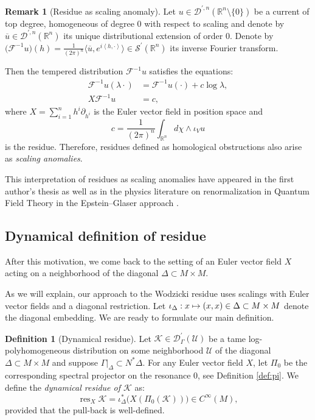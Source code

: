 \documentclass[JEP,XML,SOM,Unicode]{cedram}
\let\pazocal\mathscr
\def\mto{\mathchoice{\longmapsto}{\mapsto}{\mapsto}{\mapsto}}
\theoremstyle{definition}
\newtheorem{definition}[theorem]{Definition}
\newtheorem{remark}[theorem]{Remark}
\newcommand\rr{{\mathbb R}}
\let\euler X
\let\Feuler V
\let\exd u
\DeclareMathOperator{\resnorm}{res}
\newcommand{\resdyn}{{\resnorm_\euler}}
\begin{document}
\begin{remark}[Residue as scaling anomaly]\label{l:scalanomal}
Let $\exd\in \pazocal{D}^{\prime,n}(\rr^n\setminus\{0\})$ be a current of top degree, homogeneous of degree $0$ with respect to scaling and denote by $\overline{\exd}\in \pazocal{D}^{\prime,n}(\rr^n)$ its unique distributional extension of order $0$.
Denote by $\big(\pazocal{F}^{-1}\exd\big)(h)=\frac{1}{(2\pi)^n}\langle \overline{\exd}, e^{i\left\langle h,\cdot \right\rangle}\rangle\in \pazocal{S}^\prime(\rr^n)$ its inverse Fourier transform.

Then the tempered distribution $\pazocal{F}^{-1}\exd$ satisfies the equations:
\[
\begin{aligned}
\pazocal{F}^{-1}\exd(\lambda\cdot)&=\pazocal{F}^{-1}\exd(\cdot)+c\log\lambda,\\
\euler \pazocal{F}^{-1}\exd&=c,
\end{aligned}
\]
where $\euler=\sum_{i=1}^n h^i\partial_{h^i}$ is the Euler vector field in position space and
\[
c=\frac{1}{(2\pi)^n}\int_{\rr^n} d\chi\wedge \iota_\Feuler \exd
\]
is the residue. Therefore, residues defined as homological obstructions also arise as \emph{scaling anomalies}.
\end{remark}

This interpretation of residues as scaling anomalies have appeared in the first author's thesis \cite[\S8]{dangthesis} as well as in the physics literature on renormalization in Quantum Field Theory in the Epstein--Glaser approach \cite{Nikolov2013,Gracia-Bondia2014,Rejzner2020}.

\subsection{Dynamical definition of residue} After this motivation, we come back to the setting of an Euler vector field $\euler$ acting on a neighborhood of the diagonal $\Delta\subset M\times M$.

As we will explain, our approach to the Wodzicki residue uses scalings with Euler vector fields and a diagonal restriction.
Let $\iota_\Delta: x\mto (x,x)\in \Delta\subset M\times M$
denote the diagonal embedding.
We are ready to formulate our main definition.
\begin{definition}[Dynamical residue]
Let $\pazocal{K}\in \pazocal{D}^\prime_\Gamma(\pazocal{U})$ be a tame log-poly\-homo\-geneous distribution on some neighborhood $\pazocal{U}$ of the diagonal $\Delta\subset M\times M$
and suppose $\Gamma|_{\Delta}\subset N^*\Delta$.
For any Euler vector field $\euler$, let $\Pi_0$
be the corresponding spectral projector on the resonance $0$, see Definition \ref{def:pi}. We define
the \emph{dynamical residue of $\pazocal{K}$} as:
\[
\resdyn \pazocal{K} = \iota_\Delta^*\big(\euler (\Pi_0(\pazocal{K}))\big) \in C^\infty(M),
\]
provided that the pull-back is well-defined.
\end{definition}
\end{document}
